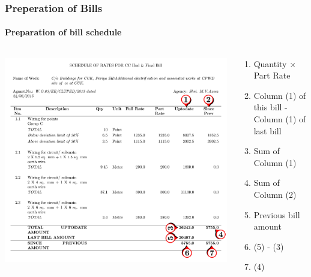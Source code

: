 \documentclass{beamer}
\begin{document}
\begin{frame}
  \frametitle{Preperation of Bills}
  \framesubtitle{Preparation of bill schedule}
  \begin{columns}
    \begin{column}{.5\textwidth}
        \begin{block}{}
        \centering
        \includegraphics[width=1\linewidth]{figures/schedule.pdf}
      \end{block}
    \end{column}
    \begin{column}{.5\textwidth}
    \pause
    \begin{enumerate}[<+->]
	   	\item Quantity $\times$ Part Rate
	   	\item Column (1) of this bill - Column (1) of last bill
	   	\item Sum of Column (1)
	   	\item Sum of Column (2)
	   	\item Previous bill amount
	   	\item (5) - (3)
	   	\item (4) \\
	 \end{enumerate}
    \end{column}
  \end{columns}
\end{frame}
\end{document}
